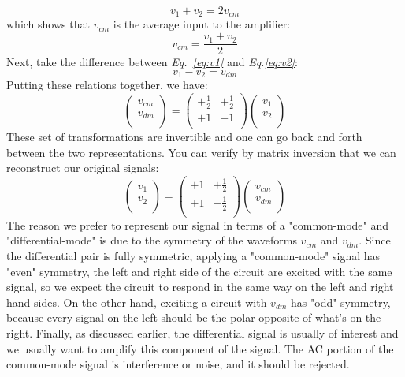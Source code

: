     \begin{equation}
        v_1 + v_2 = 2 v_{cm}
    \end{equation}
which shows that $v_{cm}$ is the average input to the amplifier:
    \begin{equation}
        v_{cm} = \frac{v_1 + v_2}{2}
    \end{equation}
Next, take the difference between \emph{Eq.~\ref{eq:v1}} and \emph{Eq.\ref{eq:v2}}:
    \begin{equation}
        v_1 - v_2 = v_{dm} 
    \end{equation}
Putting these relations together, we have:
    \begin{equation}
    	\begin{pmatrix}
    		v_{cm}\\
    		v_{dm}\\
    	\end{pmatrix} =
    	\begin{pmatrix}
    		+\frac{1}{2} & +\frac{1}{2}\\
    		+1 & -1\\
    	\end{pmatrix} 
    	\begin{pmatrix}
    		v_{1}\\
    		v_{2}\\
    	\end{pmatrix} 
    \end{equation}  
These set of transformations are invertible and one can go back and forth between the two representations.  You can verify by matrix inversion that we can reconstruct our original signals:
    \begin{equation}
    	\begin{pmatrix}
    		v_{1}\\
    		v_{2}\\
    	\end{pmatrix} =
    	\begin{pmatrix}
    		+1 & +\frac{1}{2}\\
    		+1 & -\frac{1}{2}\\
    	\end{pmatrix} 
    	\begin{pmatrix}
    		v_{cm}\\
    		v_{dm}\\
    	\end{pmatrix} 
    \end{equation}  
The reason we prefer to represent our signal in terms of a "common-mode" and "differential-mode" is due to the symmetry of the waveforms $v_{cm}$ and $v_{dm}$.  Since the differential pair is fully symmetric, applying a "common-mode" signal has "even" symmetry, the left and right side of the circuit are excited with the same signal, so we expect the circuit to respond in the same way on the left and right hand sides.  On the other hand, exciting a circuit with $v_{dm}$ has "odd" symmetry, because every signal on the left should be the polar opposite of what's on the right.	Finally, as discussed earlier, the differential signal is usually of interest and we usually want to amplify this component of the signal. The AC portion of the common-mode signal is interference or noise, and it should be rejected.  
